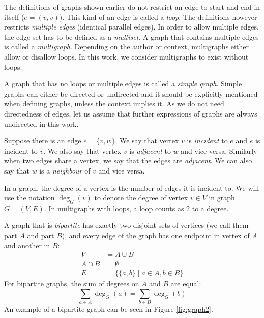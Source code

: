 The definitions of graphs shown earlier do not restrict an edge to start and end in itself ($e=(v, v)$).
This kind of an edge is called a \emph{loop}.
The definitions however restricts \emph{multiple edges} (identical parallel edges).
In order to allow multiple edges, the edge set has to be defined as a \emph{multiset}.
A graph that contains multiple edges is called a \emph{multigraph}.
Depending on the author or context, multigraphs either allow or disallow loops.
In this work, we consider multigraphs to exist without loops.

A graph that has no loops or multiple edges is called a \emph{simple graph}.
Simple graphs can either be directed or undirected and it should be explicitly mentioned when defining graphs, unless the context implies it.
As we do not need directedness of edges, let us assume that further expressions of graphs are always undirected in this work.

Suppose there is an edge $e=\{v,w\}$.
We say that vertex $v$ is \emph{incident} to $e$ and $e$ is incident to $v$.
We also say that vertex $v$ is \emph{adjacent} to $w$ and vice versa.
Similarly when two edges share a vertex, we say that the edges are \emph{adjacent}.
We can also say that $w$ is a \emph{neighbour} of $v$ and vice versa.

In a graph, the degree of a vertex is the number of edges it is incident to.
We will use the notation $\deg_G(v)$ to denote the degree of vertex $v \in V$ in graph $G=(V,E)$.
In multigraphs with loops, a loop counts as 2 to a degree.

A graph that is \emph{bipartite} has exactly two disjoint sets of vertices (we call them part $A$ and part $B$), and every edge of the graph has one endpoint in vertex of $A$ and another in $B$:
\begin{align}
V &= A \cup B\\
A \cap B &= \emptyset\\
E &=\{\{a, b\} \mid a \in A, b \in B\}
\end{align}
For bipartite graphs, the sum of degrees on $A$ and $B$ are equal:
\begin{equation}
\sum_{a\in A} \deg_G(a) = \sum_{b\in B} \deg_G(b)
\end{equation}
An example of a bipartite graph can be seen in Figure \ref{fig:graph2}.

